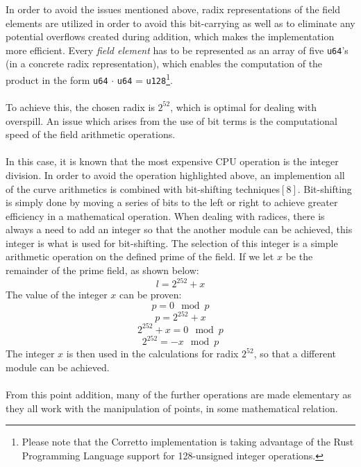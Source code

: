 \documentclass{article}
\begin{document}
In order to avoid the issues mentioned above, radix representations of the field elements are utilized in order to avoid this bit-carrying as well as to eliminate any potential overflows created during addition, which makes the implementation more efficient. Every \textit{field element} has to be represented as an array of five \texttt{u64}'s (in a concrete radix representation), which enables the computation of the product in the form \texttt{u64} $\cdot$ \texttt{u64} = \texttt{u128}\footnote{Please note that the Corretto implementation is taking advantage of the Rust Programming Language support for 128-unsigned integer operations.}.
\\\\
To achieve this, the chosen radix is $2^{52}$, which is optimal for dealing with overspill. An issue which arises from the use of bit terms is the computational speed of the field arithmetic operations. \\\\
In this case, it is known that the most expensive CPU operation is the integer division. In order to avoid the operation highlighted above, an implemention all of the curve arithmetics is combined with bit-shifting techniques$[8]$. Bit-shifting is simply done by moving a series of bits to the left or right to achieve greater efficiency in a mathematical operation. When dealing with radices, there is always a need to add an integer so that the another module can be achieved, this integer is what is used for bit-shifting. The selection of this integer is a simple arithmetic operation on the defined prime of the field. 
If we let $x$ be the remainder of the prime field, as shown below:
$$ l = 2^{252}+x $$
The value of the integer $x$ can be proven:
$$ p = 0\mod p$$  
$$ p = 2^{252}+x $$
$$ 2^{252}+x = 0\mod p $$
$$ 2^{252} = -x\mod p $$
The integer $x$ is then used in the calculations for radix $2^{52}$, so that a different module can be achieved. \\\\
From this point addition, many of the further operations are made elementary as they all work with the manipulation of points, in some mathematical relation.  


\newpage
\end{document}
